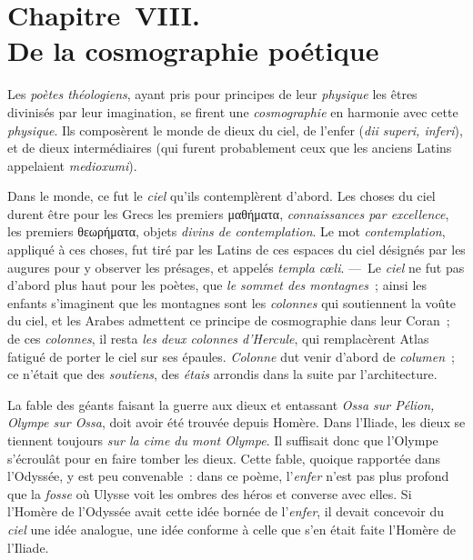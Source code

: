 \documentclass[french,twoside]{book} %
\newcommand\chapteropen{} %
\newcommand\chaptercont{} %
\newcommand\chapterclose{} %
\begin{document}
\chapteropen
\chapter[{Chapitre VIII. De la cosmographie poétique}]{Chapitre VIII. \\
De la cosmographie poétique}

\chaptercont
\noindent  Les {\itshape poètes théologiens}, ayant pris pour principes de leur {\itshape physique} les êtres divinisés par leur imagination, se firent une {\itshape cosmographie} en harmonie avec cette {\itshape physique}. Ils composèrent le monde de dieux du ciel, de l’enfer ({\itshape dii superi, inferi}), et de dieux intermédiaires (qui furent probablement ceux que les anciens Latins appelaient {\itshape medioxumi}).\par
Dans le monde, ce fut le {\itshape ciel} qu’ils contemplèrent d’abord. Les choses du ciel durent être pour les Grecs les premiers μαθήματα, {\itshape connaissances par excellence}, les premiers θεωρήματα, objets {\itshape divins de contemplation}. Le mot {\itshape contemplation}, appliqué à ces choses, fut tiré par les Latins de ces espaces du ciel désignés par les augures pour y observer les présages, et appelés {\itshape templa cœli}. — Le {\itshape ciel} ne fut pas d’abord plus haut pour les poètes, que {\itshape le sommet des montagnes} ; ainsi les enfants s’imaginent que les montagnes sont les {\itshape colonnes} qui soutiennent la voûte du ciel, et les Arabes admettent ce principe de cosmographie  dans leur Coran ; de ces {\itshape colonnes}, il resta {\itshape les deux colonnes d’Hercule}, qui remplacèrent Atlas fatigué de porter le ciel sur ses épaules. {\itshape Colonne} dut venir d’abord de {\itshape columen} ; ce n’était que des {\itshape soutiens}, des {\itshape étais} arrondis dans la suite par l’architecture.\par
La fable des géants faisant la guerre aux dieux et entassant {\itshape Ossa sur Pélion, Olympe sur Ossa}, doit avoir été trouvée depuis Homère. Dans l’Iliade, les dieux se tiennent toujours \emph{{\itshape sur la cime du mont Olympe}}. Il suffisait donc que l’Olympe s’écroulât pour en faire tomber les dieux. Cette fable, quoique rapportée dans l’Odyssée, y est peu convenable : dans ce poème, l’{\itshape enfer} n’est pas plus profond que la {\itshape fosse} où Ulysse voit les ombres des héros et converse avec elles. Si l’Homère de l’Odyssée avait cette idée bornée de l’{\itshape enfer}, il devait concevoir du {\itshape ciel} une idée analogue, une idée conforme à celle que s’en était faite l’Homère de l’Iliade.
\chapterclose
\end{document}

